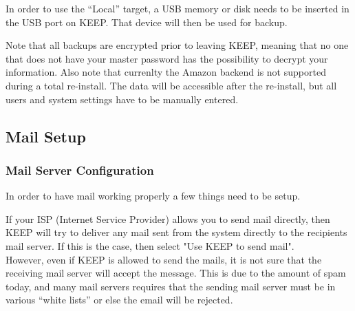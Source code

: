 \documentclass[12pt,a4paper,titlepage]{article}
\begin{document}
In order to use the ``Local'' target, a USB memory or disk needs to be inserted in the USB port on KEEP. That device will then be used for backup.

Note that all backups are encrypted prior to leaving KEEP, meaning that no one that does not have your master password has the possibility to decrypt your information.
Also note that currenlty the Amazon backend is not supported during a total re-install. The data will be accessible after the re-install, but all users and system settings have to be manually entered.

\subsection{Mail Setup}
\subsubsection{Mail Server Configuration}
In order to have mail working properly a few things need to be setup.

If your ISP (Internet Service Provider) allows you to send mail directly, then KEEP will try to deliver any mail sent from the system directly to the recipients mail server. If this is the case, then select "Use KEEP to send mail".\\
However, even if KEEP is allowed to send the mails, it is not sure that the receiving mail server will accept the message. This is due to the amount of spam today, and many mail servers requires that the sending mail server must be in various ``white lists'' or else the email will be rejected.
\end{document}
